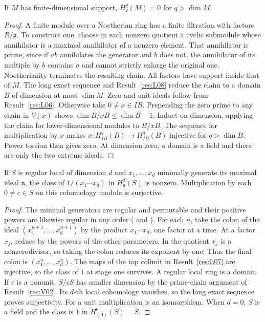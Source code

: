 \begin{theorem}\label{res:V02}
If \(M\) has finite-dimensional support, \(H_I^q(M)=0\) for
\(q>\dim M\).
\end{theorem}
\begin{proof}
A finite module over a Noetherian ring has a finite filtration
with factors \(R/\mathfrak p\). To construct one, choose in each
nonzero quotient a cyclic submodule whose annihilator is a maximal
annihilator of a nonzero element. That annihilator is prime, since
if \(ab\) annihilates the generator and \(b\) does not, the
annihilator of its multiple by \(b\) contains \(a\) and cannot
strictly enlarge the original one. Noetherianity terminates the
resulting chain. All factors have support inside that of \(M\).
The long exact sequence and Result~\ref{res:L08} reduce the claim
to a domain \(B\) of dimension at most \(\dim M\).
Zero and unit ideals follow from Result~\ref{res:L06}. Otherwise take
\(0\ne x\in IB\). Prepending the zero prime to any chain in \(V(x)\)
shows \(\dim B/xB\leq\dim B-1\). Induct on dimension, applying the
claim for lower-dimensional modules to \(B/xB\).
The sequence for multiplication by \(x\) makes
\(x:H^q_{IB}(B)\to H^q_{IB}(B)\) injective for \(q>\dim B\).
Power torsion then gives zero. At dimension zero, a domain is a field
and there are only the two extreme ideals.
\end{proof}

\begin{lemma}\label{res:V03}
If \(S\) is regular local of dimension \(d\) and
\(x_1,\ldots,x_d\) minimally generate its maximal ideal \(\mathfrak n\),
the class of \(1/(x_1\cdots x_d)\) in \(H^d_{\mathfrak n}(S)\)
is nonzero. Multiplication by each \(0\ne c\in S\) on this
cohomology module is surjective.
\end{lemma}
\begin{proof}
The minimal generators are regular and permutable and their positive
powers are likewise regular in any order
(\cite[ALG-05-C03-S03]{p103} and \cite[RK-09, CM-08]{core}).
For each \(n\), take the colon of the ideal
\((x_1^{n+1},\ldots,x_d^{n+1})\) by the product \(x_1\cdots x_d\),
one factor at a time. At a factor \(x_j\), reduce by the powers of
the other parameters. In the quotient \(x_j\) is a nonzerodivisor,
so taking the colon reduces its exponent by one. Thus the final
colon is \((x_1^n,\ldots,x_d^n)\).
The maps of the top colimit in Result~\ref{res:L07} are injective,
so the class of \(1\) at stage one survives. A regular local ring is
a domain. If \(c\) is a nonunit, \(S/cS\) has smaller dimension by
the prime-chain argument of Result~\ref{res:V02}. Its \(d\)-th local
cohomology vanishes, so the long exact sequence proves surjectivity.
For a unit multiplication is an isomorphism. When \(d=0\), \(S\)
is a field and the class is \(1\) in \(H^0_{(0)}(S)=S\).
\end{proof}

